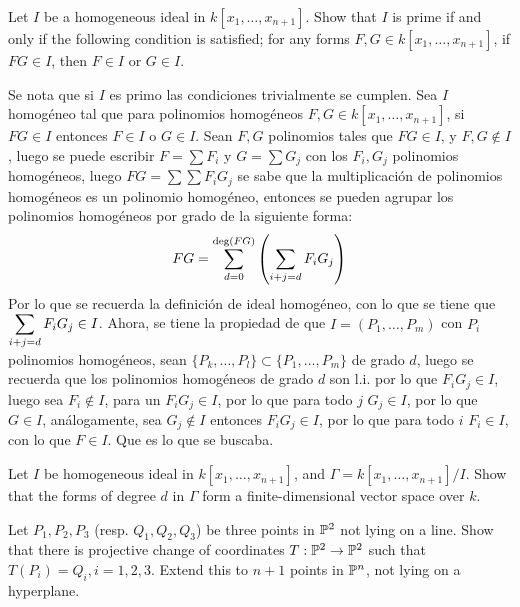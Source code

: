\begin{sol}{4.3}

\end{sol}

\begin{prob}{4.4}
    Let \(I\) be a homogeneous ideal in \(k[x_1,\dots,x_{n+1}]\). Show that \(I\) is prime if and only if the following condition is satisfied; for any forms \(F,G\in k[x_1,\dots,x_{n+1}]\), if  \(FG\in I\), then \(F\in I\) or \(G\in I\).
\end{prob}

\begin{sol}{4.4}
    Se nota que si \(I\) es primo las condiciones trivialmente se cumplen. Sea \(I\) homogéneo tal que para polinomios homogéneos \(F,G\in k[x_1,\dots,x_{n+1}]\), si \(FG\in I\) entonces \(F\in I\) o \(G\in I\). Sean \(F,G\) polinomios tales que \(FG\in I\), y \(F,G\notin I\), luego se puede escribir \(F=\sum F_i\) y \(G=\sum G_j\) con los \(F_i,G_j\) polinomios homogéneos, luego \(FG=\sum\sum F_iG_j\) se sabe que la multiplicación de polinomios homogéneos es un polinomio homogéneo, entonces se pueden agrupar los polinomios homogéneos por grado de la siguiente forma:
    \[
        FG=\sum_{d=0}^{\deg(FG)}\left(\sum_{i+j=d}F_iG_j\right)
    \]
    Por lo que se recuerda la definición de ideal homogéneo, con lo que se tiene que \(\displaystyle\sum_{i+j=d}F_iG_j\in I\). Ahora, se tiene la propiedad de que \(I=(P_1,\dots,P_m)\) con \(P_i\) polinomios homogéneos, sean \(\{P_k,\dots,P_l\}\subset\{P_1,\dots,P_m\}\) de grado \(d\), luego se recuerda que los polinomios homogéneos de grado \(d\) son l.i. por lo que \(F_iG_j\in I\), luego sea \(F_i\notin I\), para un \(F_iG_j\in I\), por lo que para todo \(j\) \(G_j\in I\), por lo que \(G\in I\), análogamente, sea \(G_j\notin I\) entonces \(F_iG_j\in I\), por lo que para todo \(i\) \(F_i\in I\), con lo que \(F\in I\). Que es lo que se buscaba.
\end{sol}

\begin{prob}{4.9}
    Let \(I\) be homogeneous ideal in \(k[x_1,\dots,x_{n+1}]\), and \(\Gamma=k[x_1,\dots,x_{n+1}]/I\). Show that the forms of degree \(d\) in \(\Gamma\) form a finite-dimensional vector space over \(k\).
\end{prob}

\begin{sol}{4.9}

\end{sol}

\begin{prob}{4.14}
    Let \(P_1,P_2,P_3\) (resp. \(Q_1,Q_2,Q_3\)) be three points in \(\mathbb{P}^2\) not lying on a line. Show that there is projective change of coordinates \(T:\mathbb{P}^2\rightarrow\mathbb{P}^2\) such that \(T(P_i)=Q_i,i=1,2,3\). Extend this to \(n+1\) points in \(\mathbb{P}^n\), not lying on a hyperplane.
\end{prob}

